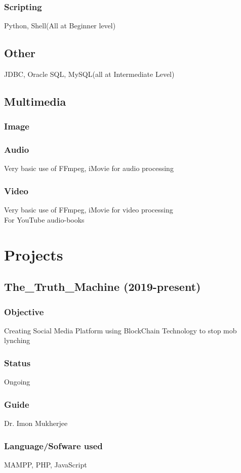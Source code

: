\documentclass{article}
\begin{document}
\subsubsection{Scripting}
Python, Shell(All at Beginner level)

\subsection{Other}
JDBC, Oracle SQL, MySQL(all at Intermediate Level)

\subsection{Multimedia}
\subsubsection{Image}
\subsubsection{Audio}
Very basic use of FFmpeg, iMovie for audio processing
\subsubsection{Video}
Very basic use of FFmpeg, iMovie for video processing\\For YouTube audio-books

\section{Projects}
\subsection{The\_Truth\_Machine (2019-present)}
\subsubsection{Objective} Creating Social Media Platform using BlockChain Technology to stop mob lynching
\subsubsection{Status} Ongoing
\subsubsection{Guide} Dr. Imon Mukherjee
\subsubsection{Language/Sofware used} MAMPP, PHP, JavaScript
\end{document}
